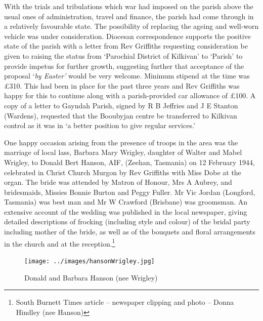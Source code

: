 With the trials and tribulations which war had imposed on the parish above the usual ones of administration, travel and finance, the parish had come through in a relatively favourable state. The possibility of replacing the ageing and well-worn vehicle was under consideration. Diocesan correspondence supports the positive state of the parish with a letter from Rev Griffiths requesting consideration be given to raising the status from `Parochial District of Kilkivan' to `Parish' to provide impetus for further growth, suggesting further that acceptance of the proposal `\emph{by Easter'} would be very welcome. Minimum stipend at the time was \pounds310. This had been in place for the past three years and Rev Griffiths was happy for this to continue along with a parish-provided car allowance of \pounds100. A copy of a letter to Gayndah Parish, signed by R B Jeffries and J E Stanton (Wardens), requested that the Booubyjan centre be transferred to Kilkivan control as it was in `a better position to give regular services.'



One happy occasion arising from the presence of troops in the area was the marriage of local lass, Barbara Mary Wrigley, daughter of Walter and Mabel Wrigley, to Donald Bert Hanson, AIF, (Zeehan, Tasmania) on 12 February 1944, celebrated in Christ Church Murgon by Rev Griffiths with Miss Dobe at the organ. The bride was attended by Matron of Honour, Mrs A Aubrey, and bridesmaids, Missies Bonnie Burton and Peggy Fuller. Mr Vic Jordan (Longford, Tasmania) was best man and Mr W Crawford (Brisbane) was groomsman. An extensive account of the wedding was published in the local newspaper, giving detailed descriptions of frocking (including style and colour) of the bridal party including mother of the bride, as well as of the bouquets and floral arrangements in the church and at the reception.\footnote{South Burnett Times article -- newspaper clipping and photo -- Donna Hindley (nee Hanson)}








\begin{figure}
\begin{center}
\texttt{[image: ../images/hansonWrigley.jpg]}
\caption{Donald and Barbara Hanson (nee Wrigley)}
\end{center}
\end{figure}




